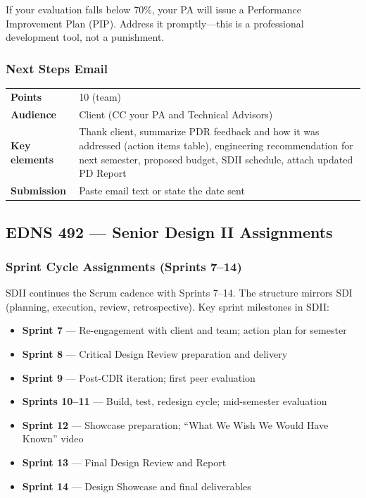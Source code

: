 \begin{tipbox}
If your evaluation falls below 70\%, your PA will issue a Performance Improvement Plan (PIP). Address it promptly---this is a professional development tool, not a punishment.
\end{tipbox}

\subsubsection{Next Steps Email}
\label{sssec:next-steps-email}

\begin{tabularx}{\textwidth}{lX}
\toprule
\textbf{Points} & 10 (team) \\
\textbf{Audience} & Client (CC your PA and Technical Advisors) \\
\textbf{Key elements} & Thank client, summarize PDR feedback and how it was addressed (action items table), engineering recommendation for next semester, proposed budget, SDII schedule, attach updated PD Report \\
\textbf{Submission} & Paste email text or state the date sent \\
\bottomrule
\end{tabularx}

\subsection{EDNS 492 --- Senior Design II Assignments}
\label{subsec:sdii-assignments}

\subsubsection{Sprint Cycle Assignments (Sprints 7--14)}
\label{sssec:sprint-cycles-sdii}

SDII continues the Scrum cadence with Sprints 7--14. The structure mirrors SDI (planning, execution, review, retrospective). Key sprint milestones in SDII:

\begin{itemize}[leftmargin=*]
  \item \textbf{Sprint 7} --- Re-engagement with client and team; action plan for semester
  \item \textbf{Sprint 8} --- Critical Design Review preparation and delivery
  \item \textbf{Sprint 9} --- Post-CDR iteration; first peer evaluation
  \item \textbf{Sprints 10--11} --- Build, test, redesign cycle; mid-semester evaluation
  \item \textbf{Sprint 12} --- Showcase preparation; ``What We Wish We Would Have Known'' video
  \item \textbf{Sprint 13} --- Final Design Review and Report
  \item \textbf{Sprint 14} --- Design Showcase and final deliverables
\end{itemize}

